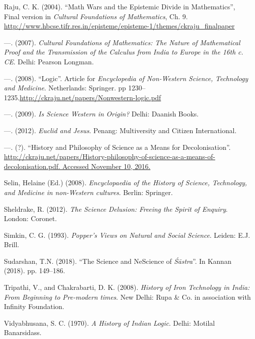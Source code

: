 \begin{thebibliography}{99}
  Raju, C. K. (2004). “Math Wars and the Epistemic Divide in Mathematics”, Final version in \textit{Cultural Foundations of Mathematics}, Ch. 9. \url{http://www.hbcse.tifr.res.in/episteme/episteme-1/themes/ckraju_finalpaper}

  —. (2007). \textit{Cultural Foundations of Mathematics: The Nature of Mathematical Proof and the Transmission of the Calculus from India to Europe in the 16th c. CE}. Delhi: Pearson Longman.

  —. (2008). “Logic”. Article for \textit{Encyclopedia of Non-Western Science, Technology and Medicine}. Netherlands: Springer. pp 1230--1235.\break \url{http://ckraju.net/papers/Nonwestern-logic.pdf}

  —. (2009). \textit{Is Science Western in Origin?} Delhi: Daanish Books.

  —. (2012). \textit{Euclid and Jesus}. Penang: Multiversity and Citizen International.

  —. (?). “History and Philosophy of Science as a Means for Decolonisation”. \url{http://ckraju.net/papers/History-philosophy-of-science-as-a-means-of-decolonisation.pdf. Accessed November 10, 2016.}

  Selin, Helaine (Ed.) (2008). \textit{Encyclopaedia of the History of Science, Technology, and Medicine in non-Western cultures}. Berlin: Springer.

  Sheldrake, R. (2012). \textit{The Science Delusion: Freeing the Spirit of Enquiry}. London: Coronet.

  Simkin, C. G. (1993). \textit{Popper's Views on Natural and Social Science}. Leiden: E.J. Brill.

  Sudarshan, T.N. (2018). “The Science and NeScience of \textit{Śāstra}”. In Kannan (2018). pp. 149--186.

  Tripathi, V., and Chakrabarti, D. K. (2008). \textit{History of Iron Technology in India: From Beginning to Pre-modern times}. New Delhi: Rupa \& Co. in association with Infinity Foundation.

  Vidyabhusana, S. C. (1970). \textit{A History of Indian Logic}. Delhi: Motilal Banarsidass.

 \end{thebibliography}

\theendnotes

